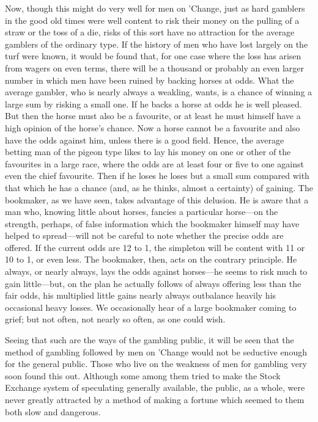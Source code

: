 \documentclass[letterpaper,12pt,oneside,openany]{memoir}
\begin{document}
Now, though this might do very well for men on
'Change, just as hard gamblers in the good old times
were well content to risk their money on the pulling of
a straw or the toss of a die, risks of this sort have no
attraction for the average gamblers of the ordinary type.
If the history of men who have lost largely on the turf
were known, it would be found that, for one case where
the loss has arisen from wagers on even terms, there will
be a thousand or probably an even larger number in
which men have been ruined by backing horses at odds.
What the average gambler, who is nearly always a
weakling, wants, is a chance of winning a large sum by
risking a small one. If he backs a horse at odds he is
well pleased. But then the horse must also be a
favourite, or at least he must himself have a high
opinion of the horse's chance. Now a horse cannot be
a favourite and also have the odds against him, unless
there is a good field. Hence, the average betting man
of the pigeon type likes to lay his money on one or other
of the favourites in a large race, where the odds are
at least four or five to one against even the chief
favourite. Then if he loses he loses but a small sum
compared with that which he has a chance (and, as he
thinks, almost a certainty) of gaining. The bookmaker,
as we have seen, takes advantage of this delusion. He is
aware that a man who, knowing little about horses, fancies
a particular horse---on the strength, perhaps, of false
information which the bookmaker himself may have
helped to spread---will not be careful to note whether the
precise odds are offered. If the current odds are 12 to 1,
the simpleton will be content with 11 or 10 to 1, or
even less. The bookmaker, then, acts on the contrary
principle. He always, or nearly always, lays the odds
against horses---he seems to risk much to gain little---but,
on the plan he actually follows of always offering
less than the fair odds, his multiplied little gains nearly
always outbalance heavily his occasional heavy losses.
We occasionally hear of a large bookmaker coming to
grief; but not often, not nearly so often, as one could
wish.

Seeing that such are the ways of the gambling
public, it will be seen that the method of gambling
followed by men on 'Change would not be seductive
enough for the general public. Those who live on the
weakness of men for gambling very soon found this out.
Although some among them tried to make the Stock
Exchange system of speculating generally available,
the public, as a whole, were never greatly attracted
by a method of making a fortune which seemed to them
both slow and dangerous.
\end{document}
